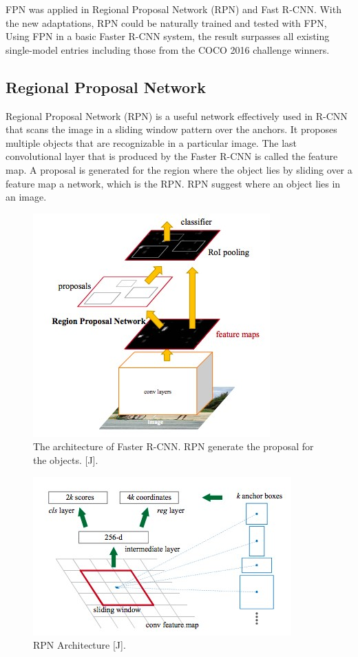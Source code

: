 FPN was applied in Regional Proposal Network (RPN) and Fast R-CNN. With the new adaptations, RPN could be naturally trained and tested with FPN, Using FPN in a basic Faster R-CNN system, the result surpasses all existing single-model entries including those from the COCO 2016 challenge winners.

\subsection{Regional Proposal Network}
Regional Proposal Network (RPN) is a useful network effectively used in R-CNN that scans the image in a sliding window pattern over the anchors.  It proposes multiple objects that are recognizable in a particular image. The last convolutional layer that is produced by the Faster R-CNN is called the feature map. A proposal is generated for the region where the object lies by sliding over a feature map a network, which is the RPN. RPN suggest where an object lies in an image.
\begin{figure}
\centering
  \includegraphics[width=0.5\linewidth]{images/rcnn-rpn.jpg}
   \caption{The architecture of Faster R-CNN. RPN generate the proposal for the objects. [J].}
\end{figure}

\begin{figure}
\centering
  \includegraphics[width=0.5\linewidth]{images/rpn-arch.jpg}
   \caption{RPN Architecture [J].}
\end{figure}

